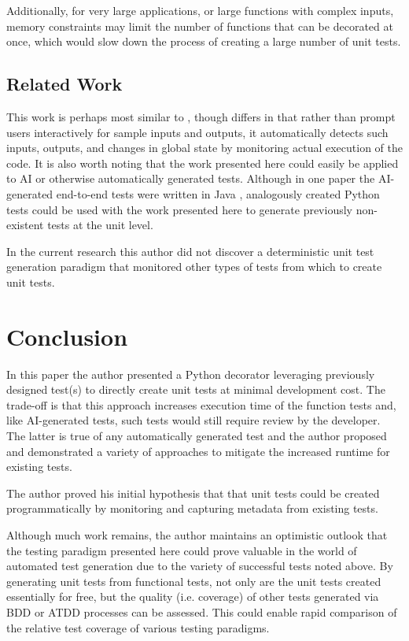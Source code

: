 \documentclass[10pt, conference]{IEEEtran}
\begin{document}
Additionally, for very large applications, or large
functions with complex inputs, memory constraints may 
limit the number of functions that can be decorated at once,
which would slow down the process of creating 
a large number of unit tests.

\subsection{Related Work}\label{sec:related-work}
This work is perhaps most similar to 
\cite{lahiri2023interactivecodegenerationtestdriven}, though
differs in that rather than prompt users interactively for sample inputs and
outputs, it automatically detects such inputs, outputs, and changes in global
state by monitoring actual execution of the code.  It is also worth noting 
that the work presented here could easily be applied to AI or otherwise 
automatically generated tests.  Although in one paper the AI-generated end-to-end tests 
were written in Java \cite{leotta2024ai}, analogously created Python tests could
be used with the work presented here to generate previously non-existent 
tests at the unit level.

In the current research this author did not discover a deterministic 
unit test generation paradigm that monitored other types of
tests from which to create unit tests.
 \section{Conclusion}\label{sec:conclusion}
In this paper the author presented
a Python decorator leveraging previously designed test(s) to directly create 
unit tests at minimal development cost.
The trade-off is that this approach increases execution time of the function 
tests and, like AI-generated tests, such tests would still require review by the 
developer. The latter is true of any automatically generated test and 
the author proposed and demonstrated a variety of approaches to 
mitigate the increased runtime for existing tests.

The author proved his initial hypothesis that 
that unit tests could be
created programmatically by monitoring and capturing 
metadata from existing tests.

Although much work remains, the author maintains an optimistic outlook
that the testing paradigm presented here could prove valuable in the 
world of automated test generation due to the variety of successful 
tests noted above.  By generating unit tests from functional tests, 
not only are the unit tests created essentially for free,
but the quality (i.e. coverage) of other tests generated via BDD or ATDD 
processes can be assessed. This could enable rapid comparison
of the relative test coverage of various testing paradigms.
\end{document}
